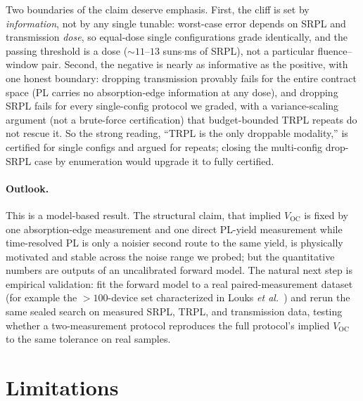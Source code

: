 \documentclass[11pt]{article}
\newcommand{\Voc}{V_{\mathrm{OC}}}
\begin{document}
Two boundaries of the claim deserve emphasis. First, the cliff is set by \emph{information}, not by any single tunable: worst-case error depends on SRPL and transmission \emph{dose}, so equal-dose single configurations grade identically, and the passing threshold is a dose ($\sim 11$--$13$ suns$\cdot$ms of SRPL), not a particular fluence--window pair. Second, the negative is nearly as informative as the positive, with one honest boundary: dropping transmission provably fails for the entire contract space (PL carries no absorption-edge information at any dose), and dropping SRPL fails for every single-config protocol we graded, with a variance-scaling argument (not a brute-force certification) that budget-bounded TRPL repeats do not rescue it. So the strong reading, ``TRPL is the only droppable modality,'' is certified for single configs and argued for repeats; closing the multi-config drop-SRPL case by enumeration would upgrade it to fully certified.

\paragraph{Outlook.} This is a model-based result. The structural claim, that implied $\Voc$ is fixed by one absorption-edge measurement and one direct PL-yield measurement while time-resolved PL is only a noisier second route to the same yield, is physically motivated and stable across the noise range we probed; but the quantitative numbers are outputs of an uncalibrated forward model. The natural next step is empirical validation: fit the forward model to a real paired-measurement dataset (for example the $>100$-device set characterized in Louks \emph{et al.}~\cite{louks2025}) and rerun the same sealed search on measured SRPL, TRPL, and transmission data, testing whether a two-measurement protocol reproduces the full protocol's implied $\Voc$ to the same tolerance on real samples.

\section{Limitations}
\end{document}
